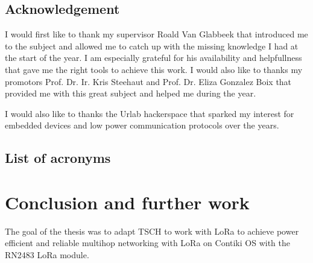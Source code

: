 \documentclass[11pt]{report}
\begin{document}
\newpage

\section*{Acknowledgement}

I would first like to thank my supervisor Roald Van Glabbeek that introduced me
to the subject and allowed me to catch up with the missing knowledge I had at
the start of the year.
I am especially grateful for his availability and helpfullness that gave me the
right tools to achieve this work.
I would also like to thanks my promotors Prof. Dr. Ir. Kris Steehaut and Prof.
Dr. Eliza Gonzalez Boix that provided me with this great subject and helped me 
during the year.

I would also like to thanks the Urlab hackerspace that sparked my interest for
embedded devices and low power communication protocols over the years.

\newpage

\tableofcontents

\newpage

\listoffigures

\newpage

\section*{List of acronyms}



\newpage










\chapter{Conclusion and further work}

The goal of the thesis was to adapt TSCH to work with LoRa to achieve power
efficient and reliable multihop networking with LoRa on Contiki OS with the 
RN2483 LoRa module.

\paragraph{}
\end{document}
